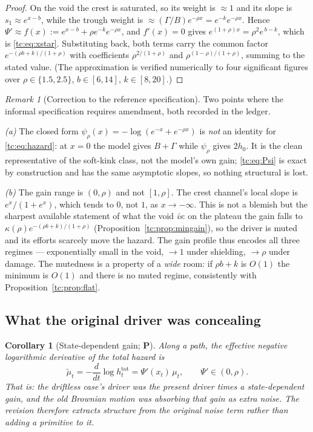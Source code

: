 \documentclass[11pt]{article}
\numberwithin{equation}{section}
\theoremstyle{plain}
\newtheorem{corollary}[theorem]{Corollary}
\theoremstyle{definition}
\theoremstyle{remark}
\newtheorem{remark}[theorem]{Remark}
\begin{document}
\begin{proof}
On the void the crest is saturated, so its weight is $\approx1$ and its
slope is $s_{1}\approx e^{x-b}$, while the trough weight is
$\approx(\Gamma/B)e^{-\rho x}=e^{-k}e^{-\rho x}$. Hence
$\Psi'\approx f(x):=e^{x-b}+\rho e^{-k}e^{-\rho x}$, and $f'(x)=0$ gives
$e^{(1+\rho)x}=\rho^{2}e^{\,b-k}$, which is \eqref{tc:eq:xstar}.
Substituting back, both terms carry the common factor
$e^{-(\rho b+k)/(1+\rho)}$ with coefficients $\rho^{2/(1+\rho)}$ and
$\rho^{(1-\rho)/(1+\rho)}$, summing to the stated value. (The
approximation is verified numerically to four significant figures over
$\rho\in\{1.5,2.5\}$, $b\in[6,14]$, $k\in[8,20]$.)
\end{proof}

\begin{remark}[Correction to the reference specification]
\label{tc:rem:speccorr}
Two points where the informal specification requires amendment, both
recorded in the ledger.

\emph{(a)} The closed form $\psi_\rho(x)=-\log(e^{-x}+e^{-\rho x})$ is
\emph{not} an identity for \eqref{tc:eq:hazard}: at $x=0$ the model
gives $B+\Gamma$ while $\psi_\rho$ gives $2h_0$. It is the clean
representative of the soft-kink class, not the model's own gain;
\eqref{tc:eq:Psi} is exact by construction and has the same asymptotic
slopes, so nothing structural is lost.

\emph{(b)} The gain range is $(0,\rho)$ and not $[1,\rho]$. The crest
channel's local slope is $e^{x}/(1+e^{x})$, which tends to $0$, not $1$,
as $x\to-\infty$. This is not a blemish but the sharpest available
statement of what the void \emph{is}: on the plateau the gain falls to
$\kappa(\rho)e^{-(\rho b+k)/(1+\rho)}$
(Proposition~\ref{tc:prop:mingain}), so
the driver is muted and its efforts scarcely move the hazard. The gain
profile thus encodes all three regimes --- exponentially small in the
void, $\to1$ under shielding, $\to\rho$ under damage. The mutedness is a
property of a \emph{wide} room: if $\rho b+k$ is $O(1)$ the minimum is
$O(1)$ and there is no muted regime, consistently with
Proposition~\ref{tc:prop:flat}.
\end{remark}

\subsection{What the original driver was concealing}
\label{tc:subsub:concealed}

\begin{corollary}[State-dependent gain; \textbf{P}]
\label{tc:cor:concealed}
Along a path, the effective negative logarithmic derivative of the total
hazard is
\begin{equation}\label{tc:eq:effmu}
\tilde\mu_t=-\frac{d}{dt}\log h^{\mathrm{tot}}_t
=\Psi'(x_t)\,\mu_t,
\qquad \Psi'\in(0,\rho).
\end{equation}
That is: \emph{the driftless case's driver was the present driver times a
state-dependent gain}, and the old Brownian motion was absorbing that
gain as extra noise. The revision therefore extracts structure from the
original noise term rather than adding a primitive to it.
\end{corollary}
\end{document}
